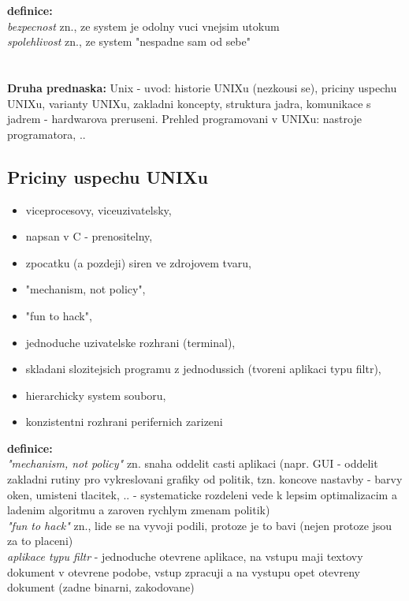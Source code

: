 \documentclass[a4paper, 11pt]{article}
\begin{document}
\noindent\textbf{definice:} \\[0.5em]
\textit{bezpecnost} zn., ze system je odolny vuci vnejsim utokum \\[0.2em]
\textit{spolehlivost} zn., ze system "nespadne sam od sebe"




\newpage

\section{}
\textbf{Druha prednaska:} Unix - uvod: historie UNIXu (nezkousi se), priciny uspechu UNIXu, varianty UNIXu, zakladni koncepty, struktura jadra, komunikace s jadrem - hardwarova preruseni. Prehled programovani v UNIXu: nastroje programatora, ..


\subsection{Priciny uspechu UNIXu}
\begin{itemize}
    \item viceprocesovy, viceuzivatelsky,
    \item napsan v C - prenositelny,
    \item zpocatku (a pozdeji) siren ve zdrojovem tvaru,
    \item "mechanism, not policy",
    \item "fun to hack",
    \item jednoduche uzivatelske rozhrani (terminal),
    \item skladani slozitejsich programu z jednodussich (tvoreni aplikaci typu filtr),
    \item hierarchicky system souboru,
    \item konzistentni rozhrani perifernich zarizeni \\
\end{itemize}

\noindent\textbf{definice:} \\[0.5em]
\textit{"mechanism, not policy"} zn. snaha oddelit casti aplikaci (napr. GUI - oddelit zakladni rutiny pro vykreslovani grafiky od politik, tzn. koncove nastavby - barvy oken, umisteni tlacitek, .. - systematicke rozdeleni vede k lepsim optimalizacim a ladenim algoritmu a zaroven rychlym zmenam politik) \\[0.2em]
\textit{"fun to hack"} zn., lide se na vyvoji podili, protoze je to bavi (nejen protoze jsou za to placeni) \\[0.2em]
\textit{aplikace typu filtr} - jednoduche otevrene aplikace, na vstupu maji textovy dokument v otevrene podobe, vstup zpracuji a na vystupu opet otevreny dokument (zadne binarni, zakodovane) \\[1em]
\end{document}
